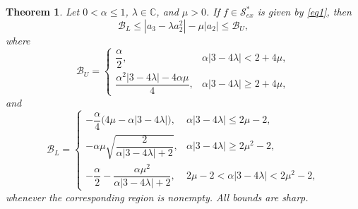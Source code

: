 \documentclass[11pt,reqno]{amsart}
\newtheorem{theo}{Theorem}[section]
\numberwithin{equation}{section}
\begin{document}
\begin{theo}\label{T5}
Let $0<\alpha\le1$, $\lambda\in\mathbb{C}$, and $\mu>0$. If $f\in\mathcal{S}_{ex}^{\ast}$ is given by \eqref{eq1}, then
\begin{equation}\label{FGbounds}
\mathcal{B}_L
\le
|a_3-\lambda a_2^2|-\mu|a_2|
\le
\mathcal{B}_U,
\end{equation}
where
\begin{equation}\label{FGU}
\mathcal{B}_U
=
\begin{cases}
\dfrac{\alpha}{2}, & \alpha|3-4\lambda| < 2+4\mu,\\[6pt]
\dfrac{\alpha^2|3-4\lambda|-4\alpha\mu}{4}, & \alpha|3-4\lambda| \ge 2+4\mu,
\end{cases}
\end{equation}
and
\begin{equation}\label{FGL}
\mathcal{B}_L
=
\begin{cases}
-\dfrac{\alpha}{4}\bigl(4\mu-\alpha|3-4\lambda|\bigr), & \alpha|3-4\lambda| \le 2\mu-2,\\[8pt]
-\alpha\mu\sqrt{\dfrac{2}{\alpha|3-4\lambda|+2}}, & \alpha|3-4\lambda| \ge 2\mu^2-2,\\[8pt]
-\dfrac{\alpha}{2}-\dfrac{\alpha\mu^2}{\alpha|3-4\lambda|+2}, & 2\mu-2<\alpha|3-4\lambda|<2\mu^2-2,
\end{cases}
\end{equation}
whenever the corresponding region is nonempty. All bounds are sharp.
\end{theo}
\end{document}
